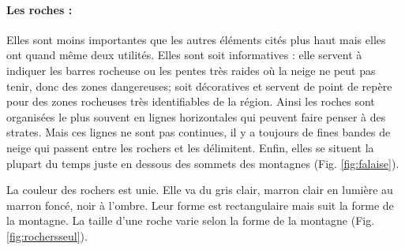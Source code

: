 \paragraph*{Les roches :} Elles sont moins importantes que les autres éléments cités plus haut mais elles ont quand même deux utilités. Elles sont soit informatives : elle servent à indiquer les barres rocheuse ou les pentes très raides où la neige ne peut pas tenir, donc des zones dangereuses; soit décoratives et servent de point de repère pour des zones rocheuses très identifiables de la région. Ainsi les roches sont organisées le plus souvent en lignes horizontales qui peuvent faire penser à des strates. Mais ces lignes ne sont pas continues, il y a toujours de fines bandes de neige qui passent entre les rochers et les délimitent. Enfin, elles se situent la plupart du temps juste en dessous des sommets des montagnes (Fig. \ref{fig:falaise}).

La couleur des rochers est unie. Elle va du gris clair, marron clair en lumière au marron foncé, noir à l'ombre. Leur forme est rectangulaire mais suit la forme de la montagne. La taille d'une roche varie selon la forme de la montagne (Fig.\ref{fig:rochersseul}).



